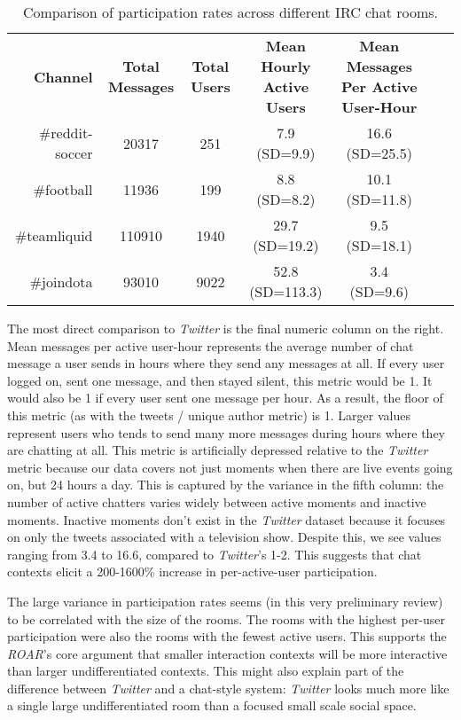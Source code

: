 \begin{table*}[tb]
\begin{tabular}{r|cccccl}
\textbf{Channel} & \textbf{Total Messages} & \textbf{Total Users} & \textbf{Mean Hourly Active Users} & \textbf{Mean  Messages Per Active User-Hour} \\

\#reddit-soccer & 20317 & 251 & 7.9 (SD=9.9) & 16.6 (SD=25.5) \\
\#football & 11936 & 199 & 8.8 (SD=8.2) & 10.1 (SD=11.8) \\
\#teamliquid & 110910 & 1940 & 29.7 (SD=19.2) & 9.5 (SD=18.1) \\
\#joindota & 93010 & 9022 & 52.8 (SD=113.3) & 3.4 (SD=9.6) \\
	
\end{tabular}
\label{tab:chat_message_rates}
\caption{Comparison of participation rates across different IRC chat rooms.}
\end{table*}

The most direct comparison to \emph{Twitter} is the final numeric column on the right. Mean messages per active user-hour represents the average number of chat message a user sends in hours where they send any messages at all. If every user logged on, sent one message, and then stayed silent, this metric would be 1. It would also be 1 if every user sent one message per hour. As a result, the floor of this metric (as with the tweets / unique author metric) is 1. Larger values represent users who tends to send many more messages during hours where they are chatting at all. This metric is artificially depressed relative to the \emph{Twitter} metric because our data covers not just moments when there are live events going on, but 24 hours a day. This is captured by the variance in the fifth column: the number of active chatters varies widely between active moments and inactive moments. Inactive moments don't exist in the \emph{Twitter} dataset because it focuses on only the tweets associated with a television show. Despite this, we see values ranging from 3.4 to 16.6, compared to \emph{Twitter}'s 1-2. This suggests that chat contexts elicit a 200-1600\% increase in per-active-user participation. 

The large variance in participation rates seems (in this very preliminary review) to be correlated with the size of the rooms. The rooms with the highest per-user participation were also the rooms with the fewest active users. This supports the \emph{ROAR}'s core argument that smaller interaction contexts will be more interactive than larger undifferentiated contexts. This might also explain part of the difference between \emph{Twitter} and a chat-style system: \emph{Twitter} looks much more like a single large undifferentiated room than a focused small scale social space.

